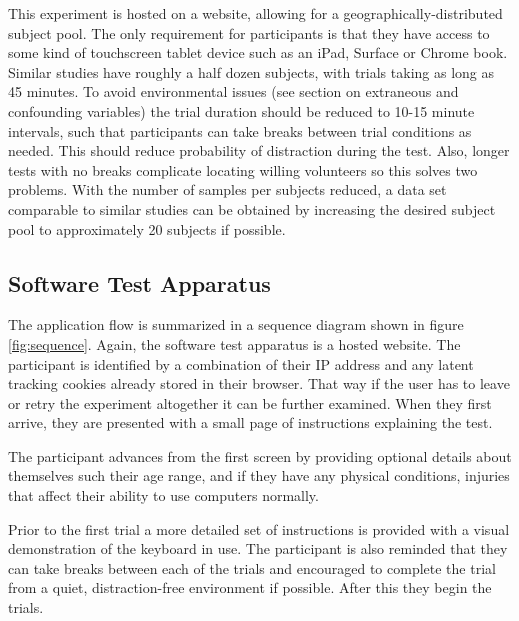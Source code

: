\documentclass[english]{vgtc}
\begin{document}
This experiment is hosted on a website, allowing for a geographically-distributed subject pool.  
The only requirement for participants is that they have access to some kind of touchscreen 
tablet device such as an iPad, Surface or Chrome book. Similar studies have roughly a half 
dozen subjects, with trials taking as long  as 45 minutes. To avoid environmental issues 
(see section on extraneous and  confounding variables) the trial duration should be reduced to
10-15 minute intervals, such that participants can take breaks between trial conditions as 
needed.  This should reduce probability of distraction during the test. Also, longer 
tests with no breaks complicate locating willing volunteers so this solves two problems.
With the number of samples per subjects reduced, a data set comparable
to similar studies can be obtained by increasing the desired subject
pool to approximately 20 subjects if possible.

\subsection{Software Test Apparatus}

The application flow is summarized in a sequence diagram shown in figure \ref{fig:sequence}.
Again, the software test apparatus is a hosted website. The participant is
identified by a combination of their IP address and any latent tracking
cookies already stored in their browser.  That way if the user has to leave
or retry the experiment altogether it can be further examined.
When they first arrive, they are presented with a small page of 
instructions explaining the test.

The participant advances from the first screen by providing optional details 
about themselves such their age range, and if they have any physical conditions, injuries
that affect their ability to use computers normally.

Prior to the first trial a more detailed set of instructions is provided
with a visual demonstration of the keyboard in use. The participant is also
reminded that they can take breaks between each of the trials and encouraged
to complete the trial from a quiet, distraction-free environment if possible.
After this they begin the trials.
\end{document}
